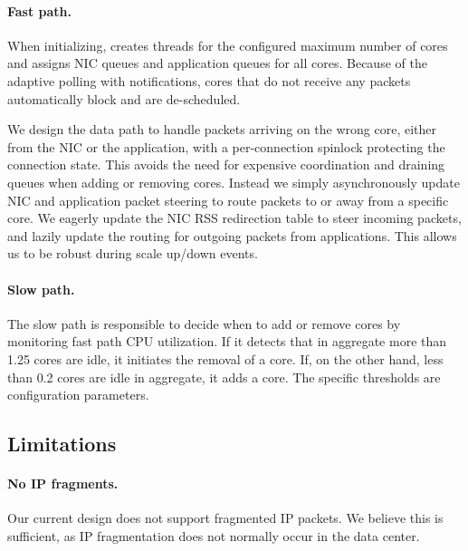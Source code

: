 \paragraph{Fast path.}
When initializing, \rmttcp creates threads for the configured maximum
number of cores and assigns NIC queues and application queues for all
cores.  Because of the adaptive polling with notifications, cores that
do not receive any packets automatically block and are de-scheduled.

We design the data path to handle packets arriving on the wrong
\rmttcp core, either from the NIC or the application, with a
per-connection spinlock protecting the connection state.  This avoids
the need for expensive coordination and draining queues when adding or
removing cores.  Instead we simply asynchronously update NIC and
application packet steering to route packets to or away from a
specific core.  We eagerly update the NIC RSS redirection table to
steer incoming packets, and lazily update the routing for outgoing
packets from applications. This allows us to be robust during scale
up/down events.

\paragraph{Slow path.}
The slow path is responsible to decide when to add or remove cores by
monitoring fast path CPU utilization.  If it detects that in aggregate
more than 1.25 cores are idle, it initiates the removal of a core.
If, on the other hand, less than 0.2 cores are idle in aggregate, it
adds a core.  The specific thresholds are configuration parameters.

\subsection{Limitations}


\paragraph{No IP fragments.} 
Our current design does not support fragmented IP packets. We believe
this is sufficient, as IP fragmentation does not normally occur in the
data center.
